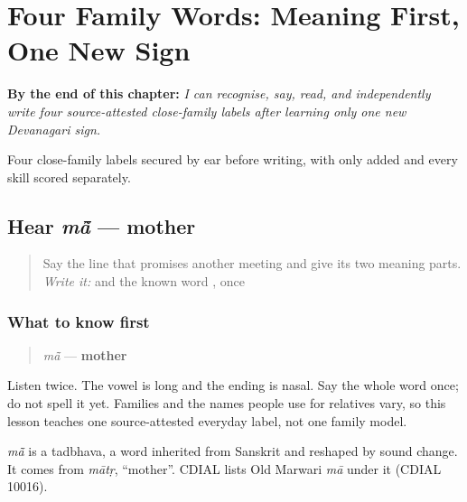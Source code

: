 
\chapter{Four Family Words: Meaning First, One New Sign}
\label{ch:mw-family-four}

\begin{chapteropening}
\textbf{By the end of this chapter:} \emph{I can recognise, say, read, and independently write four source-attested close-family labels after learning only one new Devanagari sign.}

Four close-family labels secured by ear before writing, with only  added and every skill scored separately.
\end{chapteropening}

\section[mā̃]{Hear \emph{mā̃} — mother}

\label{lesson:MW-C08-hear-maa}



\begin{quote}
Say the line that promises another meeting and give its two meaning parts. \emph{Write it:} \textbf{} and the known word \textbf{}, once
\end{quote}

\subsection*{What to know first}
\begin{quote}
\emph{mā̃} — \textbf{mother}
\end{quote}

Listen twice. The vowel is long and the ending is nasal. Say the whole word once; do not spell it yet. Families and the names people use for relatives vary, so this lesson teaches one source-attested everyday label, not one family model.

\begin{cousinweb}
\emph{mā̃} is a tadbhava, a word inherited from Sanskrit and reshaped by sound change. It comes from \emph{mātṛ}, \textquotedblleft{}mother\textquotedblright{}. CDIAL lists Old Marwari \emph{mā} under it (CDIAL 10016).
\end{cousinweb}


